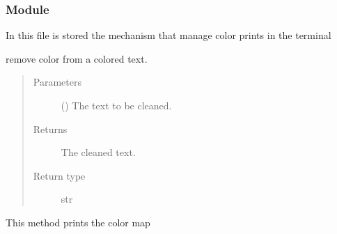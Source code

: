 \documentclass[a4paper,10pt,english]{sphinxmanual}
\begin{document}
\subsubsection{ Module}
\label{\detokenize{commands/apidoc/src:printcolors-module}}\label{\detokenize{commands/apidoc/src:module-src.printcolors}}
In this file is stored the mechanism that manage color prints in the terminal

\begin{fulllineitems}
\label{\detokenize{commands/apidoc/src:src.printcolors.cleancolor}}
remove color from a colored text.
\begin{quote}\begin{description}
\item[{Parameters}] \leavevmode
{} () \textendash{} The text to be cleaned.

\item[{Returns}] \leavevmode
The cleaned text.

\item[{Return type}] \leavevmode
str

\end{description}\end{quote}

\end{fulllineitems}


\begin{fulllineitems}
\label{\detokenize{commands/apidoc/src:src.printcolors.print_color_map}}
This method prints the color map

\end{fulllineitems}

\end{document}
